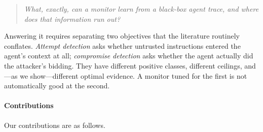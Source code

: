 \documentclass[preprint,12pt,authoryear]{elsarticle}
\theoremstyle{definition}
\begin{document}
\begin{quote}
\emph{What, exactly, can a monitor learn from a black-box agent trace, and where
does that information run out?}
\end{quote}

Answering it requires separating two objectives that the literature routinely
conflates. \emph{Attempt detection} asks whether untrusted instructions entered
the agent's context at all; \emph{compromise detection} asks whether the agent
actually did the attacker's bidding. They have different positive classes,
different ceilings, and---as we show---different optimal evidence. A monitor
tuned for the first is not automatically good at the second.

\paragraph{Contributions} Our contributions are as follows.
\end{document}
